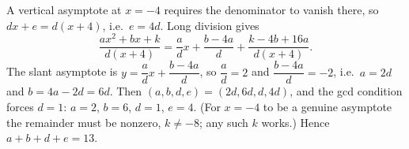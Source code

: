 A vertical asymptote at $x=-4$ requires the denominator to vanish there, so $dx+e=d(x+4)$, i.e.\ $e=4d$. Long division gives
\[
\dfrac{ax^2+bx+k}{d(x+4)}=\dfrac {a}{d} x+\dfrac{b-4a}{d}+\dfrac{k-4b+16a}{d(x+4)} .
\]
The slant asymptote is $y=\dfrac {a}{d}x+\dfrac{b-4a}{d}$, so $\dfrac {a}{d}=2$ and $\dfrac{b-4a}{d}=-2$, i.e.\ $a=2d$ and $b=4a-2d=6d$. Then $(a,b,d,e)=(2d,6d,d,4d)$, and the gcd condition forces $d=1$: $a=2$, $b=6$, $d=1$, $e=4$. (For $x=-4$ to be a genuine asymptote the remainder must be nonzero, $k\ne-8$; any such $k$ works.) Hence $a+b+d+e=\boxed{13}$.
